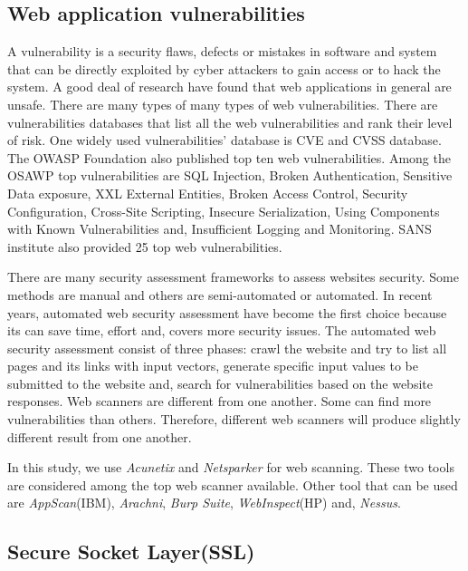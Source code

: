 \documentclass[conference,letterpaper]{IEEEtran}
\begin{document}
\subsection{Web application vulnerabilities}

A vulnerability is a security flaws, defects or mistakes in software
and system that can be directly exploited by cyber attackers to gain
access or to hack the
system\cite{awang2014survey}\cite{srinivasan2017web}. A good deal of
research have found that web applications in general are
unsafe\cite{alsmadi2016government}\cite{antunes2014penetration}. There
are many types of many types of web vulnerabilities. There are
vulnerabilities databases that list all the web vulnerabilities and
rank their level of risk. One widely used vulnerabilities' database is
CVE and CVSS database\cite{mell2006common}. The OWASP Foundation also
published top ten web vulnerabilities\cite{bertino2017botnets}. Among
the OSAWP top vulnerabilities are SQL Injection, Broken
Authentication, Sensitive Data exposure, XXL External Entities, Broken
Access Control, Security Configuration, Cross-Site Scripting,
Insecure Serialization, Using Components with Known Vulnerabilities
and, Insufficient Logging and
Monitoring\cite{owasp10application}. SANS institute also provided 25
top web vulnerabilities\cite{scholte2012have}.

There are many security assessment frameworks to assess websites
security. Some methods are manual and others are semi-automated or
automated. In recent years, automated web security assessment have
become the first choice because its can save time, effort and, covers
more security issues. The automated web security assessment consist of
three phases: crawl the website and try to list all pages and its
links with input vectors, generate specific input values to be
submitted to the website and, search for vulnerabilities based on the
website responses\cite{munoz2013methods}.  Web scanners are different
from one another. Some can find more vulnerabilities than
others. Therefore, different web scanners will produce slightly
different result from one another.

In this study, we use \emph{Acunetix} and \emph{Netsparker} for web
scanning. These two tools are considered among the top web scanner
available. Other tool that can be used are \emph{AppScan}(IBM),
\emph{Arachni}, \emph{Burp Suite}, \emph{WebInspect}(HP) and,
\emph{Nessus}\cite{makino2015evaluation}\cite{roldan2017comparison}.

\subsection{Secure Socket Layer(SSL)}
\end{document}
